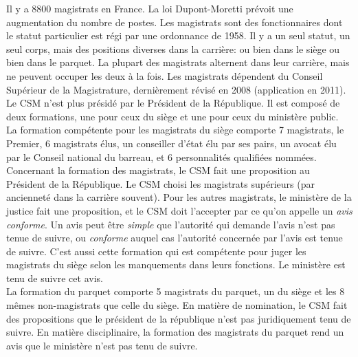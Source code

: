 \documentclass[math]{cours}
\begin{document}
	Il y a 8800 magistrats en France. La loi Dupont-Moretti prévoit une augmentation du nombre de postes.
	Les magistrats sont des fonctionnaires dont le statut particulier est régi par une ordonnance de 1958.
	Il y a un seul statut, un seul corps, mais des positions diverses dans la carrière:
	ou bien dans le siège ou bien dans le parquet.
	La plupart des magistrats alternent dans leur carrière, mais ne peuvent occuper les deux à la fois.
	Les magistrats dépendent du Conseil Supérieur de la Magistrature, dernièrement révisé en 2008 (application en 2011).
	Le CSM n'est plus présidé par le Président de la République.
	Il est composé de deux formations, une pour ceux du siège et une pour ceux du ministère public.\\

	La formation compétente pour les magistrats du siège comporte 7 magistrats, le Premier, 6 magistrats élus, un conseiller d'état élu par ses pairs, un avocat élu par le Conseil national du barreau, et 6 personnalités qualifiées nommées.
	Concernant la formation des magistrats, le CSM fait une proposition au Président de la République.
	Le CSM choisi les magistrats supérieurs (par ancienneté dans la carrière souvent).
	Pour les autres magistrats, le ministère de la justice fait une proposition, et le CSM doit l'accepter par ce qu'on appelle un \emph{avis conforme}.
	Un avis peut être \emph{simple} que l'autorité qui demande l'avis n'est pas tenue de suivre, ou \emph{conforme} auquel cas l'autorité concernée par l'avis est tenue de suivre.
	C'est aussi cette formation qui est compétente pour juger les magistrats du siège selon les manquements dans leurs fonctions.
	Le ministère est tenu de suivre cet avis.\\
	La formation du parquet comporte 5 magistrats du parquet, un du siège et les 8 mêmes non-magistrats que celle du siège.
	En matière de nomination, le CSM fait des propositions que le président de la république n'est pas juridiquement tenu de suivre.
	En matière disciplinaire, la formation des magistrats du parquet rend un avis que le ministère n'est pas tenu de suivre.
\end{document}
